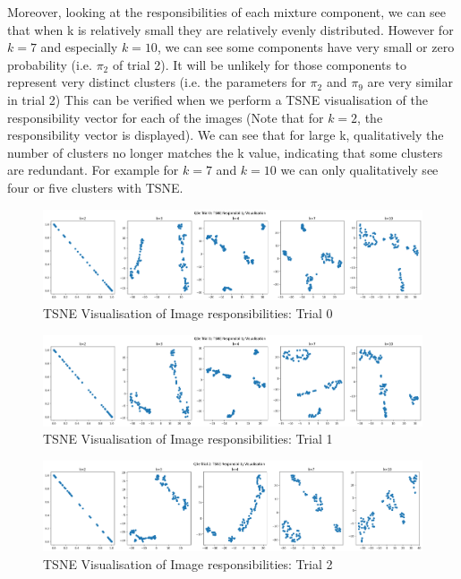 \documentclass[12pt]{article}
\begin{document}
\begin{enumerate}
\newpage

Moreover, looking at the responsibilities of each mixture component, we can see that when k is relatively small they are relatively evenly distributed. However for $k=7$ and especially $k=10$, we can see some components have very small or zero probability (i.e. $\pi_2$ of trial 2). It will be unlikely for those components to represent very distinct clusters (i.e. the parameters for $\pi_2$ and $\pi_9$ are very similar in trial 2) This can be verified when we perform a TSNE visualisation of the responsibility vector for each of the images (Note that for $k=2$, the responsibility vector is displayed). We can see that for large k, qualitatively the number of clusters no longer matches the k value, indicating that some clusters are redundant. For example for $k=7$ and $k=10$ we can only qualitatively see four or five clusters with TSNE.

\begin{figure}[h]
  \centering
  \includegraphics[scale=0.35]{outputs/q3/q3e-0-tsne}
  \caption{TSNE Visualisation of Image responsibilities: Trial 0}
  \label{fig:3e-tsne-0}
\end{figure}
\begin{figure}[h]
  \centering
  \includegraphics[scale=0.35]{outputs/q3/q3e-1-tsne}
  \caption{TSNE Visualisation of Image responsibilities: Trial 1}
  \label{fig:3e-tsne-1}
\end{figure}
\begin{figure}[h]
  \centering
  \includegraphics[scale=0.35]{outputs/q3/q3e-2-tsne}
  \caption{TSNE Visualisation of Image responsibilities: Trial 2}
  \label{fig:3e-tsne-2}
\end{figure}
\newpage


\end{enumerate}
\end{document}
